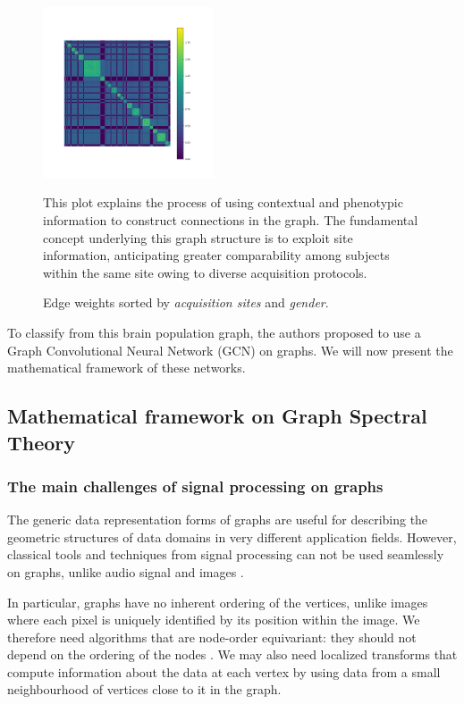 \begin{figure}[h!]
    \centering
    \includegraphics[width=0.45\textwidth]{figures/sorted_adjacency_by_site_id_by_sex.png}
    \caption{Edge weights sorted by \textit{acquisition sites} and \textit{gender}.} This plot explains the process of using contextual and phenotypic information to construct connections in the graph. The fundamental concept underlying this graph structure is to exploit site information, anticipating greater comparability among subjects within the same site owing to diverse acquisition protocols.
    \Description{}
    \label{fig:sorted_adjacency}
\end{figure}

To classify from this brain population graph, the authors \cite{Parisot17} proposed to use a Graph Convolutional Neural Network (GCN) on graphs. We will now present the mathematical framework of these networks.

\subsection{Mathematical framework on Graph Spectral Theory}
\subsubsection{The main challenges of signal processing on graphs} 

The generic data representation forms of graphs are useful for describing the geometric structures of data domains in very different application fields.
However, classical tools and techniques from signal processing can not be used seamlessly on graphs, unlike audio signal and images \cite{shuman_emerging_2013}.

In particular, graphs have no inherent ordering of the vertices, unlike images where each pixel is uniquely identified by its position within the image. We therefore need algorithms that are node-order equivariant: they should not depend on the ordering of the nodes \cite{daigavane_understanding_2021}. We may also need localized transforms that compute information about the data at each vertex by using data from a small neighbourhood of vertices close to it in the graph.

